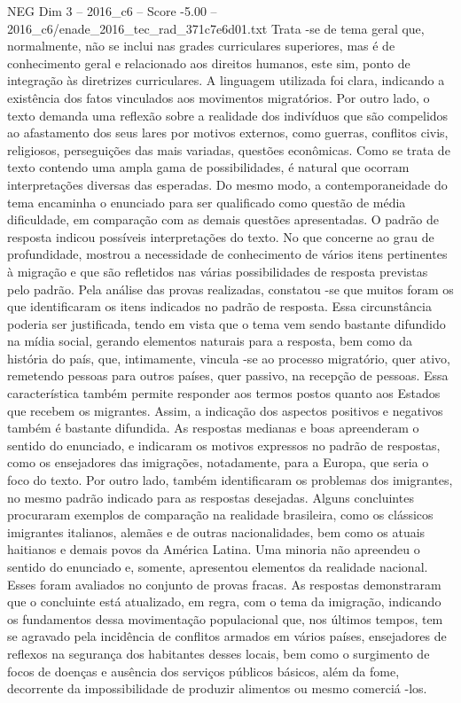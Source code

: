 \begin{textsample}{NEG Dim 3 – 2016\_c6 – Score -5.00 – 2016\_c6/enade\_2016\_tec\_rad\_371c7e6d01.txt}
Trata -se de tema geral que, normalmente, não se inclui nas grades curriculares superiores, mas é de conhecimento geral e relacionado aos direitos humanos, este sim, ponto de integração às diretrizes curriculares.
A linguagem utilizada foi clara, indicando a existência dos fatos vinculados aos movimentos migratórios.
Por outro lado, o texto demanda uma reflexão sobre a realidade dos indivíduos que são compelidos ao afastamento dos seus lares por motivos externos, como guerras, conflitos civis, religiosos, perseguições das mais variadas, questões econômicas.
Como se trata de texto contendo uma ampla gama de possibilidades, é natural que ocorram interpretações diversas das esperadas.
Do mesmo modo, a contemporaneidade do tema encaminha o enunciado para ser qualificado como questão de média dificuldade, em comparação com as demais questões apresentadas.
O padrão de resposta indicou possíveis interpretações do texto.
No que concerne ao grau de profundidade, mostrou a necessidade de conhecimento de vários itens pertinentes à migração e que são refletidos nas várias possibilidades de resposta previstas pelo padrão.
Pela análise das provas realizadas, constatou -se que muitos foram os que identificaram os itens indicados no padrão de resposta.
Essa circunstância poderia ser justificada, tendo em vista que o tema vem sendo bastante difundido na mídia social, gerando elementos naturais para a resposta, bem como da história do país, que, intimamente, vincula -se ao processo migratório, quer ativo, remetendo pessoas para outros países, quer passivo, na recepção de pessoas.
Essa característica também permite responder aos termos postos quanto aos Estados que recebem os migrantes.
Assim, a indicação dos aspectos positivos e negativos também é bastante difundida.
As respostas medianas e boas apreenderam o sentido do enunciado, e indicaram os motivos expressos no padrão de respostas, como os ensejadores das imigrações, notadamente, para a Europa, que seria o foco do texto.
Por outro lado, também identificaram os problemas dos imigrantes, no mesmo padrão indicado para as respostas desejadas.
Alguns concluintes procuraram exemplos de comparação na realidade brasileira, como os clássicos imigrantes italianos, alemães e de outras nacionalidades, bem como os atuais haitianos e demais povos da América Latina.
Uma minoria não apreendeu o sentido do enunciado e, somente, apresentou elementos da realidade nacional.
Esses foram avaliados no conjunto de provas fracas.
As respostas demonstraram que o concluinte está atualizado, em regra, com o tema da imigração, indicando os fundamentos dessa movimentação populacional que, nos últimos tempos, tem se agravado pela incidência de conflitos armados em vários países, ensejadores de reflexos na segurança dos habitantes desses locais, bem como o surgimento de focos de doenças e ausência dos serviços públicos básicos, além da fome, decorrente da impossibilidade de produzir alimentos ou mesmo comerciá -los.

\end{textsample}
